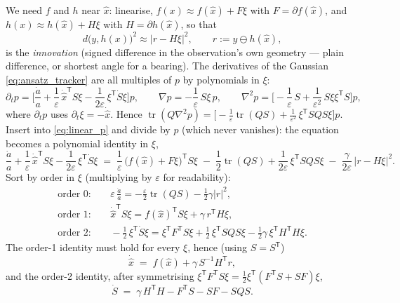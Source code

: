 \documentclass[11pt,a4paper]{article}
\newcommand{\tr}{\operatorname{tr}}
\newcommand{\T}{^{\mathsf T}}
\newcommand{\xh}{\hat{x}}
\newcommand{\eps}{\varepsilon}
\newcommand{\abs}[1]{\left\lvert #1 \right\rvert}
\newcommand{\grad}{\nabla}
\theoremstyle{plain}
\theoremstyle{definition}
\theoremstyle{remark}
\begin{document}
We need $f$ and $h$ near $\xh$: linearise, $f(x)\approx f(\xh)+F\xi$ with $F=\partial f(\xh)$, and $h(x)\approx h(\xh)+H\xi$ with $H=\partial h(\xh)$, so that
\[
  d\big(y,h(x)\big)^2 \approx \abs{r - H\xi}^2, \qquad r := y \ominus h(\xh),
\]
is the \emph{innovation} (signed difference in the observation's own geometry --- plain difference, or shortest angle for a bearing). The derivatives of the Gaussian \eqref{eq:ansatz_tracker} are all multiples of $p$ by polynomials in $\xi$:
\begin{equation}
  \partial_tp = \Big[\frac{\dot a}{a} + \frac1\eps\,\dot{\xh}\T S\xi - \frac{1}{2\eps}\,\xi\T\dot S\xi\Big]p, \qquad
  \grad p = -\frac1\eps\,S\xi\,p, \qquad
  \grad^2p = \Big[-\frac1\eps\,S + \frac1{\eps^2}\,S\xi\xi\T S\Big]p ,
  \label{eq:gauss_derivs}
\end{equation}
where $\partial_tp$ uses $\partial_t\xi = -\dot{\xh}$. Hence $\tr(Q\grad^2p) = \big[-\tfrac1\eps\tr(QS) + \tfrac1{\eps^2}\,\xi\T SQS\xi\big]p$. Insert into \eqref{eq:linear_p} and divide by $p$ (which never vanishes): the equation becomes a polynomial identity in $\xi$,
\begin{equation}
  \frac{\dot a}{a} + \frac1\eps\,\dot{\xh}\T S\xi - \frac{1}{2\eps}\,\xi\T\dot S\xi
  \;=\; \frac1\eps\,\big(f(\xh)+F\xi\big)\T S\xi \;-\; \frac12\tr(QS) + \frac{1}{2\eps}\,\xi\T SQS\xi \;-\; \frac{\gamma}{2\eps}\,\abs{r-H\xi}^2 .
  \label{eq:tracker_inserted}
\end{equation}
Sort by order in $\xi$ (multiplying by $\eps$ for readability):
\begin{align*}
  \text{order }0:&\quad \eps\,\frac{\dot a}{a} = -\frac\eps2\tr(QS) - \tfrac12\gamma\abs r^2 ,\\
  \text{order }1:&\quad \dot{\xh}\T S\xi = f(\xh)\T S\xi + \gamma\,r\T H\xi ,\\
  \text{order }2:&\quad -\tfrac12\,\xi\T\dot S\xi = \xi\T F\T S\xi + \tfrac12\,\xi\T SQS\xi - \tfrac12\gamma\,\xi\T H\T H\xi .
\end{align*}
The order-1 identity must hold for every $\xi$, hence (using $S=S\T$)
\begin{equation}
  \boxed{\;\dot{\xh} \;=\; f(\xh) + \gamma\, S^{-1}H\T r ,\;}
  \label{eq:tracker_x}
\end{equation}
and the order-2 identity, after symmetrising $\xi\T F\T S\xi = \tfrac12\xi\T(F\T S+SF)\xi$,
\begin{equation}
  \boxed{\;\dot S \;=\; \gamma\,H\T H - F\T S - S F - S Q S .\;}
  \label{eq:tracker_S}
\end{equation}
\end{document}
